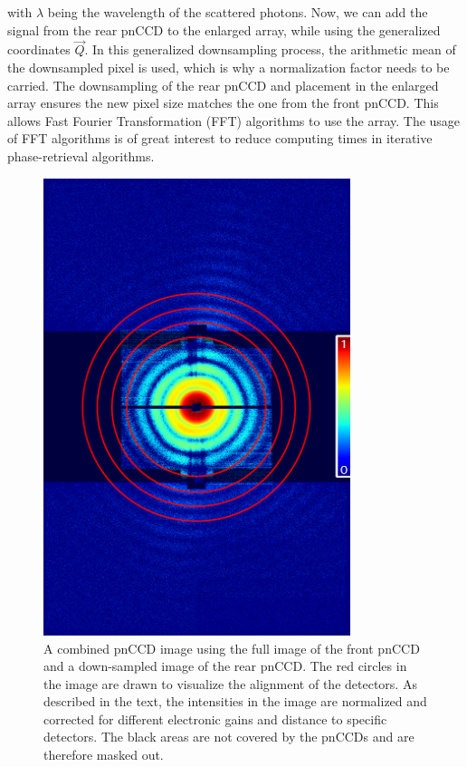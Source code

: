 with $\lambda$ being the wavelength of the scattered photons. Now, we can add the signal from the rear pnCCD to the enlarged array, while using the generalized coordinates $\vec{Q}$. In this generalized downsampling process, the arithmetic mean of the downsampled pixel is used, which is why a normalization factor needs to be carried. The downsampling of the rear pnCCD and placement in the enlarged array ensures the new pixel size matches the one from the front pnCCD. This allows Fast Fourier Transformation (FFT) algorithms to use the array. The usage of FFT algorithms is of great interest to reduce computing times in iterative phase-retrieval algorithms.\\[1\baselineskip]
%
%
%
\begin{figure}
	\centering
		\includegraphics[width=0.8\textwidth]{images/pnCCD-image-geometry2.png}
	\caption[Front and rear pnCCD arranged to combine measured diffraction image.]{A combined pnCCD image using the full image of the front pnCCD and a down-sampled image of the rear pnCCD. The red circles in the image are drawn to visualize the alignment of the detectors. As described in the text, the intensities in the image are normalized and corrected for different electronic gains and distance to specific detectors. The black areas are not covered by the pnCCDs and are therefore masked out.}
	\label{fig:pnCCD-image-aligned}
\end{figure}
